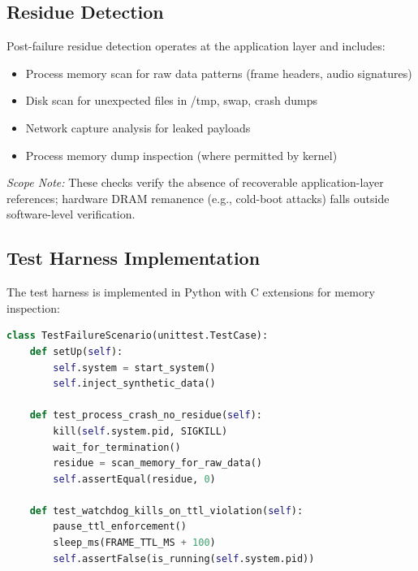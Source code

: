 \documentclass[conference]{IEEEtran}
\begin{document}
\subsection{Residue Detection}
Post-failure residue detection operates at the application layer and includes:
\begin{itemize}
    \item Process memory scan for raw data patterns (frame headers, audio signatures)
    \item Disk scan for unexpected files in /tmp, swap, crash dumps
    \item Network capture analysis for leaked payloads
    \item Process memory dump inspection (where permitted by kernel)
\end{itemize}
\textit{Scope Note:} These checks verify the absence of recoverable application-layer references; hardware DRAM remanence (e.g., cold-boot attacks) falls outside software-level verification.

\subsection{Test Harness Implementation}
The test harness is implemented in Python with C extensions for memory inspection:

\begin{lstlisting}[language=Python, caption={Fault Injection Test Structure}]
class TestFailureScenario(unittest.TestCase):
    def setUp(self):
        self.system = start_system()
        self.inject_synthetic_data()
        
    def test_process_crash_no_residue(self):
        kill(self.system.pid, SIGKILL)
        wait_for_termination()
        residue = scan_memory_for_raw_data()
        self.assertEqual(residue, 0)
        
    def test_watchdog_kills_on_ttl_violation(self):
        pause_ttl_enforcement()
        sleep_ms(FRAME_TTL_MS + 100)
        self.assertFalse(is_running(self.system.pid))
\end{lstlisting}
\end{document}
